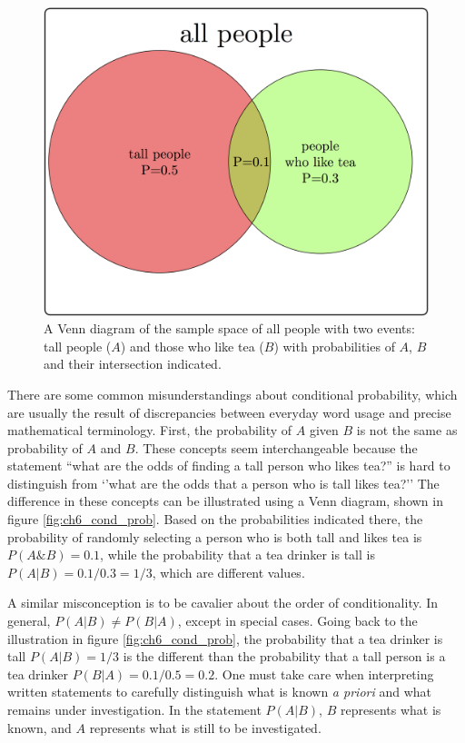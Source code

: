 \documentclass[
  letterpaper,
  DIV=11,
  numbers=noendperiod]{scrreprt}
\begin{document}
\begin{figure}

{\centering \includegraphics{./ch6/cond_prob_tikz.png}

}

\caption{A Venn diagram of the sample space of all people with two
events: tall people (\(A\)) and those who like tea (\(B\)) with
probabilities of \(A\), \(B\) and their intersection indicated.}

\end{figure}

There are some common misunderstandings about conditional probability,
which are usually the result of discrepancies between everyday word
usage and precise mathematical terminology. First, the probability of
\(A\) given \(B\) is not the same as probability of \(A\) and \(B\).
These concepts seem interchangeable because the statement ``what are the
odds of finding a tall person who likes tea?'' is hard to distinguish
from `'what are the odds that a person who is tall likes tea?'' The
difference in these concepts can be illustrated using a Venn diagram,
shown in figure \ref{fig:ch6_cond_prob}. Based on the probabilities
indicated there, the probability of randomly selecting a person who is
both tall and likes tea is \(P(A \& B) = 0.1\), while the probability
that a tea drinker is tall is \(P(A | B) = 0.1/0.3 = 1/3\), which are
different values.

A similar misconception is to be cavalier about the order of
conditionality. In general, \(P(A | B) \neq P(B |A)\), except in special
cases. Going back to the illustration in figure \ref{fig:ch6_cond_prob},
the probability that a tea drinker is tall \(P(A | B) = 1/3\) is the
different than the probability that a tall person is a tea drinker
\(P(B|A) = 0.1/0.5 = 0.2\). One must take care when interpreting written
statements to carefully distinguish what is known \emph{a priori} and
what remains under investigation. In the statement \(P(A | B)\), \(B\)
represents what is known, and \(A\) represents what is still to be
investigated.
\end{document}
